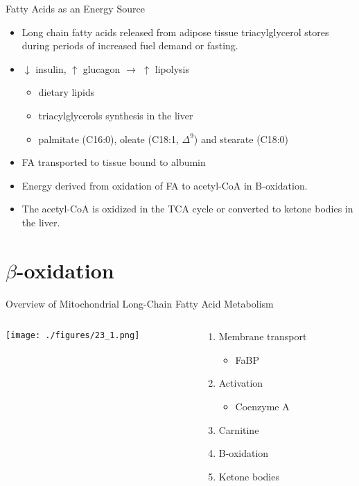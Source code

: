 \documentclass[presentation, smaller]{beamer}
\begin{document}
\begin{frame}[label={sec:orgheadline4}]{Fatty Acids as an Energy Source}
\begin{itemize}
\item Long chain fatty acids released from adipose tissue triacylglycerol
stores during periods of increased fuel demand or fasting.
\item \(\downarrow\) insulin, \(\uparrow\) glucagon \(\to\) \(\uparrow\) lipolysis
\begin{itemize}
\item dietary lipids
\item triacylglycerols synthesis in the liver
\item palmitate (C16:0), oleate (C18:1, \(\Delta ^9\)) and stearate (C18:0)
\end{itemize}
\item FA transported to tissue bound to albumin
\item Energy derived from oxidation of FA to acetyl-CoA in B-oxidation.
\item The acetyl-CoA is oxidized in the TCA cycle or converted to ketone bodies in the liver.
\end{itemize}
\end{frame}

\section{\(\beta\)-oxidation}
\label{sec:orgheadline15}
\begin{frame}[label={sec:orgheadline6}]{Overview of Mitochondrial Long-Chain Fatty Acid Metabolism}
\begin{columns}
\begin{column}{0.5\columnwidth}
\centering
\texttt{[image: ./figures/23\_1.png]}
\end{column}

\begin{column}{0.5\columnwidth}
\begin{enumerate}
\item Membrane transport
\begin{itemize}
\item FaBP
\end{itemize}
\item Activation
\begin{itemize}
\item Coenzyme A
\end{itemize}
\item Carnitine
\item B-oxidation
\item Ketone bodies
\end{enumerate}
\end{column}
\end{columns}
\end{frame}
\end{document}
